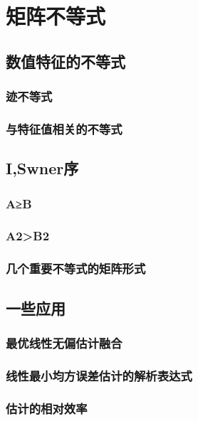 \chapter{矩阵不等式}
\label{cha:矩阵不等式}

\section{数值特征的不等式}
\label{sec:数值特征的不等式}

\subsection{迹不等式}
\label{sub:迹不等式}

\subsection{与特征值相关的不等式}
\label{sub:与特征值相关的不等式}

\section{I,Swner序}
\label{sec:I,Swner序}

\subsection{A≥B}
\label{sub:A≥B}

\subsection{A2>B2}
\label{sub:A2>B2}

\subsection{几个重要不等式的矩阵形式}
\label{sub:几个重要不等式的矩阵形式}

\section{一些应用}
\label{sec:一些应用}

\subsection{最优线性无偏估计融合}
\label{sub:最优线性无偏估计融合}

\subsection{线性最小均方误差估计的解析表达式}
\label{sub:线性最小均方误差估计的解析表达式}

\subsection{估计的相对效率}
\label{sub:估计的相对效率}
